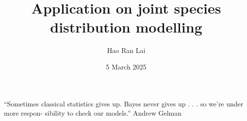 \documentclass[12pt]{beamer}
\author{Hao Ran Lai}
\title{Application on joint species distribution modelling}
\date{5 March 2025}
\begin{document}
\begin{frame}
\titlepage
\end{frame}

\begin{frame}
“Sometimes classical statistics gives up. Bayes never gives up . . . so we’re under more respon-
sibility to check our models.”
Andrew Gelman
\end{frame}
\end{document}
